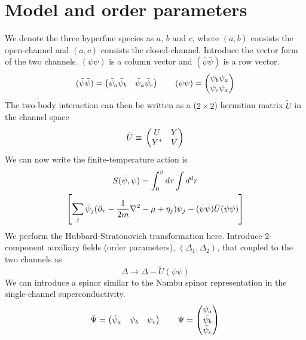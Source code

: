 \documentclass[reprint,pra]{revtex4-1}
\begin{document}
\section{Model and order parameters\label{sec:model}}
We denote the three hyperfine species as $a$, $b$ and $c$, where $(a, b)$  consists the open-channel and $(a,c)$ consists the closed-channel.  Introduce the vector form of the two channels.    $(\psi\psi)$  is a column vector and $(\bar\psi\bar\psi)$ is a row vector.
\begin{equation}
(\bar\psi\bar\psi)=\begin{pmatrix}\bar\psi_{a}\bar\psi_{b}&\bar\psi_{a}\bar\psi_{c}\end{pmatrix}
\qquad(\psi\psi)=\begin{pmatrix}\psi_{b}\psi_{a}\\\psi_{c}\psi_{a}\end{pmatrix}
\end{equation}
The two-body interaction can then be written as a ($2\times2$)  hermitian  matrix  $\tilde{U}$ in the channel space
\begin{equation}
\tilde{U}\equiv{}\begin{pmatrix}U&Y\\Y^{*}&V\end{pmatrix}
\end{equation}
We can now write the finite-temperature action is 
\begin{multline}\label{eq:pathInt2:actionFermi}
S(\bar\psi,\psi)=\int^{\beta}_{0}d\tau\int{d^{d}r}\\
\left[\sum_{j}\bar\psi_{j}(\partial_\tau-\frac{1}{2m}\nabla^{2}-\mu+\eta_{j})\psi_{j}
-(\bar\psi\bar\psi)\tilde{U}(\psi\psi)\right]
\end{multline}
We  perform the Hubbard-Stratonovich transformation here.   Introduce 2-component  auxiliary fields (order parameters), $(\Delta_{1},\Delta_{2})$, that coupled to the two channels as 
\begin{equation}\label{eq:pathInt2:DeltaPhi}
\Delta\longrightarrow\Delta-\tilde{U}(\psi\psi)
\end{equation}
We can introduce  a spinor similar to the Nambu spinor representation in the single-channel superconductivity.  
\begin{equation}
\bar\Psi=\begin{pmatrix}\bar\psi_{a}&\psi_{b}&\psi_{c}\end{pmatrix}\qquad\Psi=\begin{pmatrix}\psi_{a}\\\bar\psi_{b}\\\bar\psi_{c}\end{pmatrix}
\end{equation}
\end{document}
